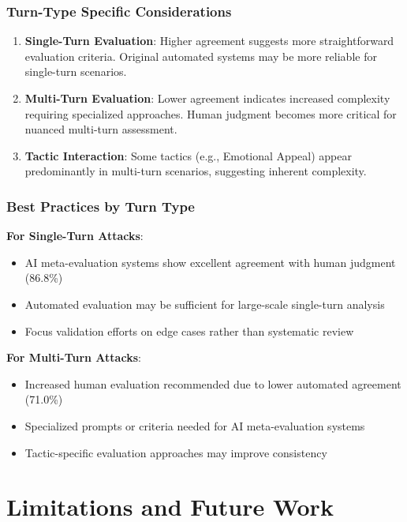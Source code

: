 \documentclass[11pt]{article}
\begin{document}
\subsubsection{Turn-Type Specific Considerations}

\begin{enumerate}
    \item \textbf{Single-Turn Evaluation}: Higher agreement suggests more straightforward evaluation criteria. Original automated systems may be more reliable for single-turn scenarios.
    
    \item \textbf{Multi-Turn Evaluation}: Lower agreement indicates increased complexity requiring specialized approaches. Human judgment becomes more critical for nuanced multi-turn assessment.
    
    \item \textbf{Tactic Interaction}: Some tactics (e.g., Emotional Appeal) appear predominantly in multi-turn scenarios, suggesting inherent complexity.
\end{enumerate}

\subsubsection{Best Practices by Turn Type}

\textbf{For Single-Turn Attacks}:
\begin{itemize}
    \item AI meta-evaluation systems show excellent agreement with human judgment (86.8\%)
    \item Automated evaluation may be sufficient for large-scale single-turn analysis
    \item Focus validation efforts on edge cases rather than systematic review
\end{itemize}

\textbf{For Multi-Turn Attacks}:
\begin{itemize}
    \item Increased human evaluation recommended due to lower automated agreement (71.0\%)
    \item Specialized prompts or criteria needed for AI meta-evaluation systems
    \item Tactic-specific evaluation approaches may improve consistency
\end{itemize}

\section{Limitations and Future Work}
\end{document}

